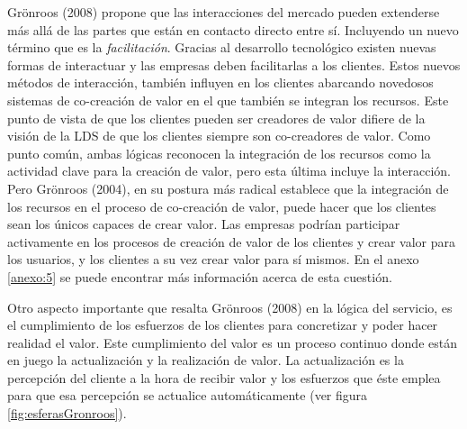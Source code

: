 Grönroos (2008) propone que las interacciones del mercado pueden extenderse más allá de las partes que están en contacto directo entre sí. Incluyendo un nuevo término que es la \emph{facilitación}. Gracias al desarrollo tecnológico existen nuevas formas de interactuar y las empresas deben facilitarlas a los clientes. Estos nuevos métodos de interacción, también influyen en los clientes abarcando novedosos sistemas de co-creación de valor en el que también se integran los recursos. Este punto de vista de que los clientes pueden ser creadores de valor difiere de la visión de la LDS de que los clientes siempre son co-creadores de valor. Como punto común, ambas lógicas reconocen la integración de los recursos como la actividad clave para la creación de valor, pero esta última incluye la interacción. Pero Grönroos (2004), en su postura más radical establece que la integración de los recursos en el proceso de co-creación de valor, puede hacer que los clientes sean los únicos capaces de crear valor. Las empresas podrían participar activamente en los procesos de creación de valor de los clientes y crear valor para los usuarios, y los clientes a su vez crear valor para sí mismos. En el anexo \ref{anexo:5} se puede encontrar más información acerca de esta cuestión.

Otro aspecto importante que resalta Grönroos (2008) en la lógica del servicio, es el cumplimiento de los esfuerzos de los clientes para concretizar y poder hacer realidad el valor. Este cumplimiento del valor es un proceso continuo donde están en juego la actualización y la realización de valor. La actualización es la percepción del cliente a la hora de recibir valor y los esfuerzos que éste emplea para que esa percepción se actualice automáticamente (ver figura \ref{fig:esferasGronroos}).

